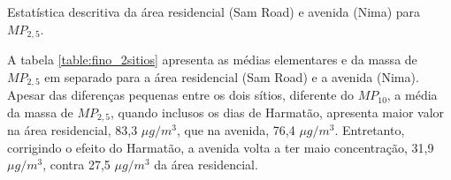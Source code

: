 \begin{table}[H]
  \centering
    
  \caption{Estatística descritiva da área residencial (Sam Road) e avenida (Nima) 
           para $MP_{2,5}$. \label{table:fino_2sitios}}
\end{table}

A tabela \ref{table:fino_2sitios} apresenta as médias elementares e
da massa de $MP_{2,5}$ em separado para a área residencial (Sam Road) e
a avenida (Nima). Apesar das diferenças pequenas entre os dois sítios, 
diferente do $MP_{10}$, a média da massa de $MP_{2,5}$, quando inclusos os dias
de Harmatão, apresenta maior valor na área residencial, 83,3 $\mu g / m^3$,
que na avenida, 76,4 $\mu g / m^3$. Entretanto, corrigindo o efeito do Harmatão,
a avenida volta a ter maio concentração, 31,9 $\mu g / m^3$, contra 27,5 
$\mu g / m^3$  da área residencial.


